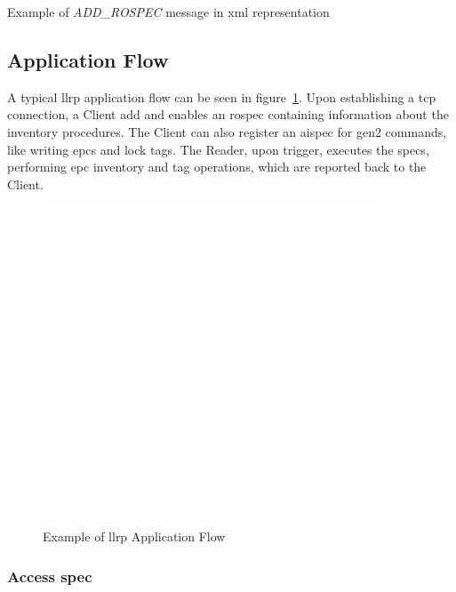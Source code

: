 \begin{listing}
    \inputminted[linenos]{xml}{./code/sota/llrp_messages/ROSPEC.xml}
    \caption{Example of \textit{ADD\_ROSPEC} message in \ac{xml} representation}
    \label{code:rospec}
\end{listing}

\subsection{Application Flow}

A typical \ac{llrp} application flow can be seen in figure~\ref{fig:llrpflow}. Upon establishing a \ac{tcp} connection, a Client add and enables an \ac{rospec} containing information about the inventory procedures. The Client can also register an \ac{aispec} for \ac{gen2} commands, like writing \acp{epc} and lock tags.
The Reader, upon trigger, executes the \acp{spec}, performing \ac{epc} inventory and tag operations, which are reported back to the Client.

\begin{figure}[!ht]
    \centering
    \includegraphics[width=0.9\textwidth]{./figs/02-state-of-the-art/llrpflow.pdf}
    \caption[Example of \ac{llrp} Application Flow]{Example of \ac{llrp} Application Flow~\cite{ImpinjLTKProgrammers}} 
    \label{fig:llrpflow}
\end{figure}


\subsubsection{Access \acl{spec}}

